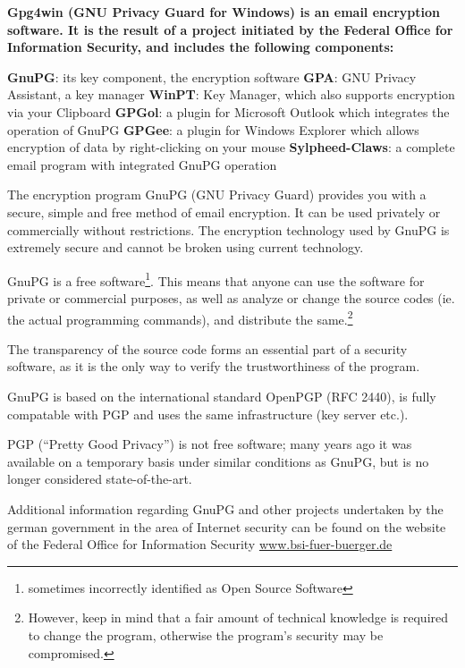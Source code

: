 

\textbf{
Gpg4win (GNU Privacy Guard for Windows) is an email encryption software.
It is the result of a project initiated by the Federal Office for
Information Security, and includes the following components: 
}

\textbf{GnuPG}: its key component, the encryption software \newline
\textbf{GPA}: GNU Privacy Assistant,
a key manager \newline
\textbf{WinPT}: Key Manager, which also supports encryption via your
Clipboard \newline
\textbf{GPGol}: a plugin for Microsoft Outlook which integrates the
operation of GnuPG \newline
\textbf{GPGee}: a plugin for Windows Explorer which allows encryption of
data by right-clicking on your mouse \newline
\textbf{Sylpheed-Claws}: a complete email program with integrated GnuPG
operation \newline

The encryption program GnuPG (GNU Privacy Guard) provides you with a
secure, simple and free method of email encryption. It can be used
privately or commercially without restrictions.  The encryption
technology used by GnuPG is extremely secure and cannot be broken using
current technology.

GnuPG is a free software\footnote{sometimes incorrectly identified as
Open Source Software}. This means that anyone can use the software for
private or commercial purposes, as well as analyze or change the source
codes (ie. the actual programming commands), and distribute the
same.\footnote{However, keep in mind that a fair amount of technical
knowledge is required to change the program, otherwise the program's
security may be compromised.}

The transparency of the source code forms an essential part of a
security software, as it is the only way to verify the trustworthiness
of the program.


GnuPG is based on the international standard OpenPGP (RFC 2440), is
fully compatable with PGP and uses the same infrastructure (key server
etc.).

PGP ("`Pretty Good Privacy"') is not free software; many years ago it
was available on a temporary basis under similar conditions as GnuPG,
but is no longer considered state-of-the-art.  

Additional information regarding GnuPG and other projects undertaken by
the german government in the area of Internet security can be found on
the website of the Federal Office for Information Security \W
{}
\T\href{http://www.bsi-fuer-buerger.de}{www.bsi-fuer-buerger.de}



